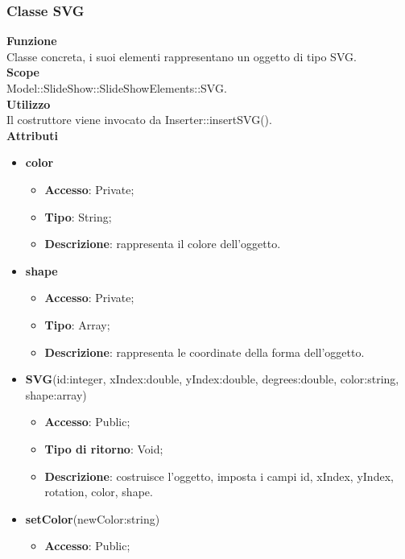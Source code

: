 {	\subsubsection{Classe SVG}{
		\label{SVG}
		\textbf{Funzione}\\
			\indent Classe concreta, i suoi elementi rappresentano un oggetto di tipo SVG.\\
	   	\textbf{Scope}\\
			\indent Model::SlideShow::SlideShowElements::SVG.\\
		\textbf{Utilizzo}\\
			\indent Il costruttore viene invocato da Inserter::insertSVG().\\
		\textbf{Attributi}
		\begin{itemize}
			\item \textbf{color}
			\begin{itemize}
				\item \textbf{Accesso}: Private;
				\item \textbf{Tipo}: String;
				\item \textbf{Descrizione}: rappresenta il colore dell’oggetto.
			\end{itemize}
			\item \textbf{shape}
			\begin{itemize}
				\item \textbf{Accesso}: Private;
				\item \textbf{Tipo}: Array;
				\item \textbf{Descrizione}: rappresenta le coordinate della forma dell’oggetto.
			\end{itemize}
		\end{itemize}
		\begin{itemize}
			\item \textbf{SVG}(id:integer, xIndex:double, yIndex:double, degrees:double, color:string, shape:array)
			\begin{itemize}
				\item \textbf{Accesso}: Public;
				\item \textbf{Tipo di ritorno}: Void;
				\item \textbf{Descrizione}: costruisce l’oggetto, imposta i campi id, xIndex, yIndex, rotation, color, shape.
			\end{itemize}
			\item \textbf{setColor}(newColor:string)
			\begin{itemize}
				\item \textbf{Accesso}: Public;

\end{itemize}
\end{itemize}}}
